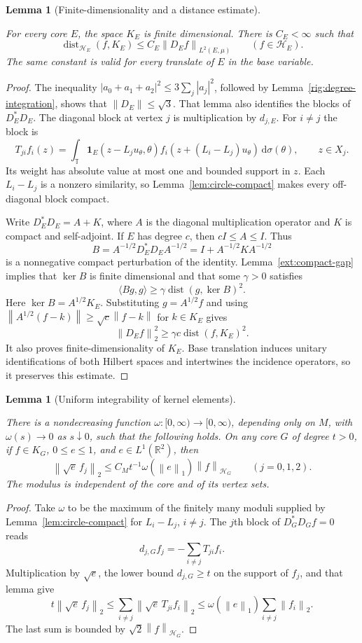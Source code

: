 \documentclass[11pt]{amsart}
\newcommand{\R}{\mathbb R}
\newcommand{\dd}{\,\mathrm d}
\newcommand{\one}{\mathbf 1}
\newcommand{\norm}[1]{\left\|#1\right\|}
\newtheorem{lemma}[theorem]{Lemma}
\theoremstyle{definition}
\theoremstyle{remark}
\numberwithin{equation}{section}
\providecommand{\lean}[1]{}
\providecommand{\leanok}{}
\begin{document}
\begin{lemma}[Finite-dimensionality and a distance estimate]\label{rig:kernel-gap}
\lean{Auto.rig_kernel_gap_finiteDimensional,Auto.rig_kernel_gap}
\leanok
For every core $E$, the space $K_E$ is finite dimensional. There is
$C_E<\infty$ such that
\[
 \operatorname{dist}_{\mathcal H_E}(f,K_E)
 \le C_E\norm{D_Ef}_{L^2(E,\mu)}\qquad(f\in\mathcal H_E).
\]
The same constant is valid for every translate of $E$ in the base variable.
\end{lemma}
\begin{proof}
The inequality $|a_0+a_1+a_2|^2\le3\sum_j|a_j|^2$, followed by
Lemma~\ref{rig:degree-integration}, shows that $\norm{D_E}\le\sqrt3$.
That lemma also identifies the blocks of $D_E^*D_E$. The diagonal block
at vertex $j$ is multiplication by $d_{j,E}$. For $i\ne j$ the block is
\[
 T_{ji}f_i(z)=\int_{\mathbb T}
 \one_E(z-L_ju_\theta,\theta)
 f_i(z+(L_i-L_j)u_\theta)\dd\sigma(\theta),\qquad z\in X_j.
\]
Its weight has absolute value at most one and bounded support in $z$.
Each $L_i-L_j$ is a nonzero similarity, so
Lemma~\ref{lem:circle-compact} makes every off-diagonal block compact.

Write $D_E^*D_E=A+K$, where $A$ is the diagonal multiplication operator
and $K$ is compact and self-adjoint. If $E$ has degree $c$, then
$cI\le A\le I$. Thus
\[
 B=A^{-1/2}D_E^*D_EA^{-1/2}=I+A^{-1/2}KA^{-1/2}
\]
is a nonnegative compact perturbation of the identity.
Lemma~\ref{ext:compact-gap} implies that $\ker B$ is finite
dimensional and that some $\gamma>0$ satisfies
\[
 \langle Bg,g\rangle\ge
 \gamma\operatorname{dist}(g,\ker B)^2.
\]
Here $\ker B=A^{1/2}K_E$. Substituting $g=A^{1/2}f$ and using
$\norm{A^{1/2}(f-k)}\ge\sqrt c\norm{f-k}$ for $k\in K_E$ gives
\[
 \norm{D_Ef}_2^2\ge\gamma c\operatorname{dist}(f,K_E)^2.
\]
It also proves finite-dimensionality of $K_E$.
Base translation induces unitary identifications of both Hilbert spaces
and intertwines the incidence operators, so it preserves this estimate.
\end{proof}

\begin{lemma}[Uniform integrability of kernel elements]\label{rig:kernel-ui}
\lean{Auto.rig_kernel_ui}
\leanok
There is a nondecreasing function $\omega:[0,\infty)\to[0,\infty)$,
depending only on $M$, with $\omega(s)\to0$ as $s\downarrow0$, such that
the following holds. On any core $G$ of degree $t>0$, if $f\in K_G$,
$0\le e\le1$, and $e\in L^1(\R^2)$, then
\[
 \norm{\sqrt e\,f_j}_2
 \le C_Mt^{-1}\omega(\norm e_1)\norm f_{\mathcal H_G}
 \qquad(j=0,1,2).
\]
The modulus is independent of the core and of its vertex sets.
\end{lemma}
\begin{proof}
Take $\omega$ to be the maximum of the finitely many moduli supplied
by Lemma~\ref{lem:circle-compact} for $L_i-L_j$, $i\ne j$.
The $j$th block of $D_G^*D_Gf=0$ reads
\[
 d_{j,G}f_j=-\sum_{i\ne j}T_{ji}f_i.
\]
Multiplication by $\sqrt e$, the lower bound $d_{j,G}\ge t$ on the
support of $f_j$, and that lemma give
\[
 t\norm{\sqrt e\,f_j}_2
 \le\sum_{i\ne j}\norm{\sqrt e\,T_{ji}f_i}_2
 \le\omega(\norm e_1)\sum_{i\ne j}\norm{f_i}_2.
\]
The last sum is bounded by $\sqrt2\norm f_{\mathcal H_G}$.
\end{proof}
\end{document}
